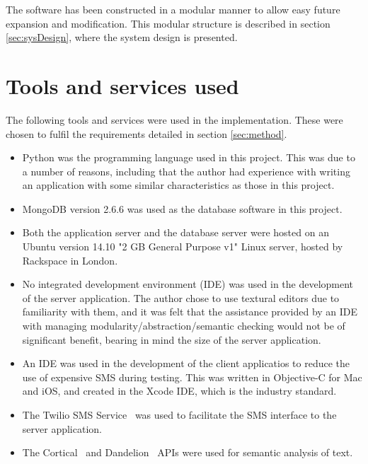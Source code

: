 \documentclass[authoryearcitations]{UoYCSproject}
\begin{document}
The software has been constructed in a modular manner to allow easy future expansion and modification. This modular structure is described in section \ref{sec:sysDesign}, where the system design is presented.

\section{Tools and services used}
\label{sec:toolsAndServices}
The following tools and services were used in the implementation. These were chosen to fulfil the requirements detailed in section \ref{sec:method}.
\begin{itemize}
  \item Python was the programming language used in this project. This was due to a number of reasons, including that the author had experience with writing an application with some similar characteristics as those in this project.
  \item MongoDB version 2.6.6 was used as the database software in this project.
  \item Both the application server and the database server were hosted on an Ubuntu version 14.10 "2 GB General Purpose v1" Linux server, hosted by Rackspace in London.
  \item No integrated development environment (IDE) was used in the development of the server application. The author chose to use textural editors due to familiarity with them, and it was felt that the assistance provided by an IDE with managing modularity/abstraction/semantic checking would not be of significant benefit, bearing in mind the size of the server application.
  \item An IDE was used in the development of the client applicatios to reduce the use of expensive SMS during testing. This was written in Objective-C for Mac and iOS, and created in the Xcode IDE, which is the industry standard.
  \item The Twilio SMS Service~\cite{serviceTwilio} was used to facilitate the SMS interface to the server application.
  \item The Cortical~\cite{serviceCorticalSim} and Dandelion~\cite{serviceDandelionSim, serviceDandelionNex} APIs were used for semantic analysis of text.
\end{itemize}
\end{document}
